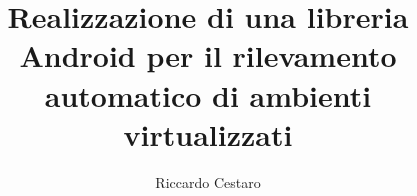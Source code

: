 \title{Realizzazione di una libreria Android per il rilevamento automatico di ambienti virtualizzati​}
\author{Riccardo Cestaro}



